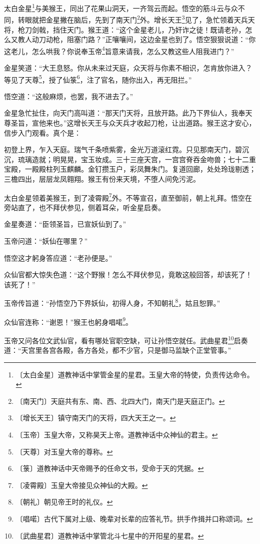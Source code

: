 \documentclass[12pt,UTF-8,openany]{ctexbook}
\begin{document}
\begin{Large}
    
    太白金星\footnote{〔太白金星〕道教神话中掌管金星的星君。玉皇大帝的特使，负责传达命令。}与美猴王，同出了花果山洞天，一齐驾云而起。悟空的筋斗云与众不同，转眼就把金星撇在脑后，先到了南天门\footnote{〔南天门〕天庭共有东、南、西、北四大门，南天门是天庭正门。}外。增长天王\footnote{〔增长天王〕镇守南天门的天将，四大天王之一。}见了，急忙领着天兵天将，枪刀剑戟，挡住天门。猴王道：“这个金星老儿，乃奸诈之徒！既请老孙，怎么又教人动刀动枪，阻塞门路？”正嚷嚷间，这边金星也到了。悟空狠狠说道：“你这老儿，怎么哄我？你说奉玉帝\footnote{〔玉帝〕玉皇大帝，又称昊天上帝。道教神话中众神仙的君主。}旨意来请我，怎么又教这些人阻我进门？”
    
    金星笑道：“大王息怒。你从未来过天庭，众天将与你素不相识，怎肯放你进入？等见了天尊\footnote{〔天尊〕对玉皇大帝的尊称。}，授了仙箓\footnote{〔箓〕道教神话中天帝赐予的任命文书，受命于天的凭据。}，注了官名，随你出入，再无阻拦。”
    
    悟空道：“这般麻烦，也罢，我不进去了。”
    
    金星急忙扯住，向天门高叫道：“那天门天将，且放开路。此乃下界仙人，我奉天尊圣旨，宣他来也。”这增长天王与众天兵才收起刀枪，让出道路。猴王这才安心，信步入门观看。真个是：
    
    初登上界，乍入天庭。瑞气千条喷紫雾，金光万道滚红霓。只见那南天门，碧沉沉，琉璃造就；明晃晃，宝玉妆成。三十三座天宫，一宫宫脊吞金吻兽；七十二重宝殿，一殿殿柱列玉麒麟。金钉攒玉户，彩凤舞朱门。复道回廊，处处玲珑剔透；三檐四出，层层龙凤翱翔。猴王有份来天境，不堕人间免污泥。
    
    太白金星领着美猴王，到了凌霄殿\footnote{〔凌霄殿〕玉皇大帝接见众神仙的大殿。}外。不等宣召，直至御前，朝上礼拜。悟空在旁站直了，也不拜伏参见，侧着耳朵，听金星启奏。
    
    金星奏道：“臣领圣旨，已宣妖仙到了。”
    
    玉帝问道：“妖仙在哪里？”
    
    悟空这才躬身答应道：“老孙便是。”
    
    众仙官都大惊失色道：“这个野猴！怎么不拜伏参见，竟敢这般回答，却该死了！该死了！”
    
    玉帝传旨道：“孙悟空乃下界妖仙，初得人身，不知朝礼\footnote{〔朝礼〕朝见帝王时的礼仪。}，姑且恕罪。”
    
    众仙官连称：“谢恩！”猴王也躬身唱喏\footnote{〔唱喏〕古代下属对上级、晚辈对长辈的应答礼节。拱手作揖并口称颂词。}。
    
    玉帝又问各位文武仙官，看有哪处官职空缺，可让孙悟空就任。武曲星君\footnote{〔武曲星君〕道教神话中掌管北斗七星中的开阳星的星君。}启奏道：“天宫里各宫各殿，各方各处，都不少官，只是御马监缺个正堂管事。”
    

\end{Large}
\end{document}
